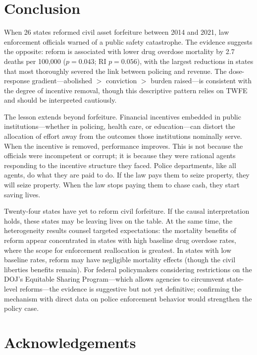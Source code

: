 \documentclass[12pt]{article}
\begin{document}
\section{Conclusion}
\label{sec:conclusion}

When 26 states reformed civil asset forfeiture between 2014 and 2021, law enforcement officials warned of a public safety catastrophe. The evidence suggests the opposite: reform is associated with lower drug overdose mortality by 2.7 deaths per 100,000 ($p = 0.043$; RI $p = 0.056$), with the largest reductions in states that most thoroughly severed the link between policing and revenue. The dose-response gradient---abolished $>$ conviction $>$ burden raised---is consistent with the degree of incentive removal, though this descriptive pattern relies on TWFE and should be interpreted cautiously.

The lesson extends beyond forfeiture. Financial incentives embedded in public institutions---whether in policing, health care, or education---can distort the allocation of effort away from the outcomes those institutions nominally serve. When the incentive is removed, performance improves. This is not because the officials were incompetent or corrupt; it is because they were rational agents responding to the incentive structure they faced. Police departments, like all agents, do what they are paid to do. If the law pays them to seize property, they will seize property. When the law stops paying them to chase cash, they start saving lives.

Twenty-four states have yet to reform civil forfeiture. If the causal interpretation holds, these states may be leaving lives on the table. At the same time, the heterogeneity results counsel targeted expectations: the mortality benefits of reform appear concentrated in states with high baseline drug overdose rates, where the scope for enforcement reallocation is greatest. In states with low baseline rates, reform may have negligible mortality effects (though the civil liberties benefits remain). For federal policymakers considering restrictions on the DOJ's Equitable Sharing Program---which allows agencies to circumvent state-level reforms---the evidence is suggestive but not yet definitive; confirming the mechanism with direct data on police enforcement behavior would strengthen the policy case.


\section*{Acknowledgements}
\end{document}

